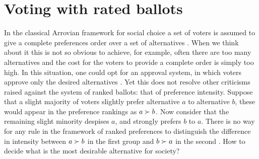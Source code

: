 



\section{Voting with rated ballots}
\label{sec:judgmentballots}

In the classical Arrovian framework for social choice a set of voters is assumed to give a complete preferences order over a set of alternatives \citep{Arrow1950}.
When we think about it this is not so obvious to achieve, for example, often there are too many alternatives and the cost for the voters to provide a complete order is simply too high.
In this situation, one could opt for an approval system, in which voters approve only the desired alternatives \citep{Brams2007}. Yet this does not resolve other criticisms raised against the system of ranked ballots: that of preference intensity. 
Suppose that a slight majority of voters slightly prefer alternative $a$ to alternative $b$, these would appear in the preference rankings as $a \succ b$. Now consider that the remaining slight minority despises $a$, and strongly prefers $b$ to $a$. There is no way for any rule in the framework of ranked preferences to distinguish the difference in intensity between $a \succ b$ in the first group and $b \succ a$ in the second . How to decide what is the most desirable alternative for society?

